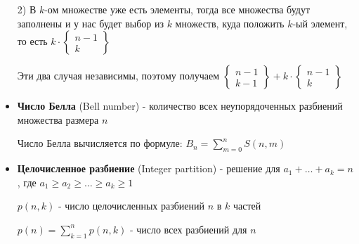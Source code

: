 \documentclass[12pt]{article}
\begin{document}
\begin{itemize}
        2) В $k$-ом множестве уже есть элементы, тогда все множества будут заполнены и у нас будет выбор из $k$ множеств,
        куда положить $k$-ый элемент, то есть $k \cdot \begin{Bmatrix}n - 1 \\ k\end{Bmatrix}$

        Эти два случая независимы, поэтому получаем $\begin{Bmatrix}n - 1 \\ k - 1\end{Bmatrix} + k \cdot \begin{Bmatrix}n - 1 \\ k\end{Bmatrix}$

        \item \textbf{Число Белла} (Bell number) - количество всех неупорядоченных разбиений множества размера $n$

        Число Белла вычисляется по формуле: $\displaystyle B_n = \sum_{m=0}^n S(n, m)$

        \item \textbf{Целочисленное разбиение} (Integer partition) - решение для $\displaystyle a_1 + \dots + a_k = n$, где $\displaystyle a_1 \geq a_2 \geq \dots \geq a_k \geq 1$

        $p(n, k)$ - число целочисленных разбиений $n$ в $k$ частей

        $\displaystyle p(n) = \sum_{k = 1}^n p(n, k)$ - число всех разбиений для $n$


    \end{itemize}
\end{document}
